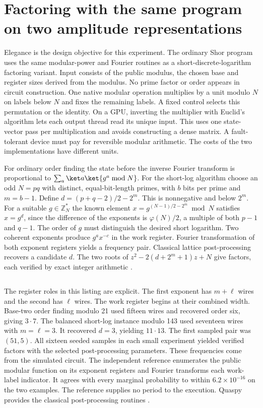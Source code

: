 \section{Factoring with the same program on two amplitude representations}
Elegance is the design objective for this experiment. The ordinary Shor program uses the same modular-power and Fourier routines as a short-discrete-logarithm factoring variant. Input consists of the public modulus, the chosen base and register sizes derived from the modulus. No prime factor or order appears in circuit construction. One native modular operation multiplies by a unit modulo $N$ on labels below $N$ and fixes the remaining labels. A fixed control selects this permutation or the identity. On a GPU, inverting the multiplier with Euclid's algorithm lets each output thread read its unique input. This uses one state-vector pass per multiplication and avoids constructing a dense matrix. A fault-tolerant device must pay for reversible modular arithmetic. The costs of the two implementations have different units.

For ordinary order finding the state before the inverse Fourier transform is proportional to $\sum_a\ket a\ket{g^a\bmod N}$. For the short-log algorithm choose an odd $N=pq$ with distinct, equal-bit-length primes, with $b$ bits per prime and $m=b-1$. Define $d=(p+q-2)/2-2^m$. This is nonnegative and below $2^m$. For a suitable $g\in\mathbb{Z}_N^*$ the known element $x=g^{(N-1)/2-2^m}\bmod N$ satisfies $x=g^d$, since the difference of the exponents is $\varphi(N)/2$, a multiple of both $p-1$ and $q-1$. The order of $g$ must distinguish the desired short logarithm. Two coherent exponents produce $g^a x^{-c}$ in the work register. Fourier transformation of both exponent registers yields a frequency pair. Classical lattice post-processing recovers a candidate $d$. The two roots of $z^2-2(d+2^m+1)z+N$ give factors, each verified by exact integer arithmetic \cite{eh,shortpost,shortsuccess}.

\inputminted[firstline=100,fontsize=\footnotesize]{qaf}{examples/prefix/factoring.qaf}
The register roles in this listing are explicit. The first exponent has $m+\ell$ wires and the second has $\ell$ wires. The work register begins at their combined width. Base-two order finding modulo 21 used fifteen wires and recovered order six, giving $3\cdot7$. The balanced short-log instance modulo 143 used seventeen wires with $m=\ell=3$. It recovered $d=3$, yielding $11\cdot13$. The first sampled pair was $(51,5)$. All sixteen seeded samples in each small experiment yielded verified factors with the selected post-processing parameters. These frequencies come from the simulated circuit. The independent reference enumerates the public modular function on its exponent registers and Fourier transforms each work-label indicator. It agrees with every marginal probability to within $6.2\times10^{-16}$ on the two examples. The reference supplies no period to the execution. Quaspy provides the classical post-processing routines \cite{orderpost,quaspy}.

